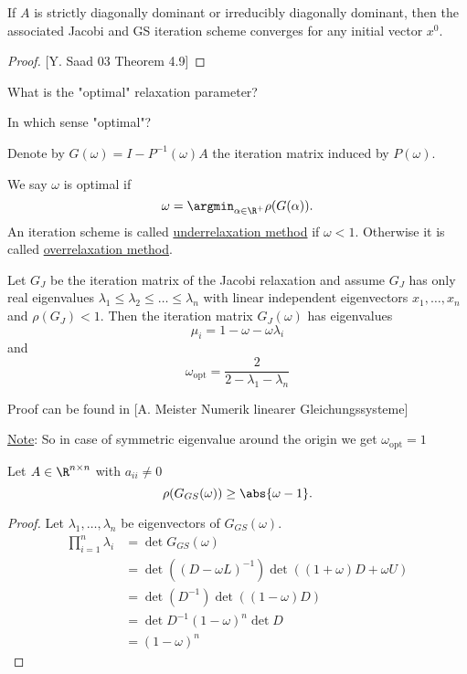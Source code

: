 \begin{theorem}
\label{thm:theorem2.3}
	If $A$ is strictly diagonally dominant or irreducibly diagonally dominant, then the associated Jacobi and GS iteration scheme converges for any initial vector $x^{0}$.
\end{theorem}

\begin{proof}
\label{thm:theorem2.3proof}
	[Y. Saad 03 Theorem 4.9]
\end{proof}

What is the "optimal" relaxation parameter?

In which sense "optimal"?

Denote by $G(\omega )=I-P^{-1}(\omega )A$ the iteration matrix induced by $P(\omega )$.

We say $\omega $ is optimal if
\[
	\omega  = \argmin_{\alpha \in \R^{+}} \rho(G(\alpha ))
.\] 
An iteration scheme is called \underline{underrelaxation method} if $\omega  < 1$. Otherwise it is called \underline{overrelaxation method}.

\begin{theorem}
\label{thm:theorem2.4}
Let $G_{J}$ be the iteration matrix of the Jacobi relaxation and assume	$G_{J}$ has only real eigenvalues $\lambda_1 \leq \lambda_2 \leq \ldots \leq \lambda_{n}$ with linear independent eigenvectors $x_1, \ldots , x_{n}$ and $\rho(G_{J}) < 1$. Then the iteration matrix $G_{J}(\omega )$ has eigenvalues
\[
\mu _{i} =  1 - \omega - \omega \lambda _{i}
\] 
and 
\[
\omega _{\text{opt}} = \frac{2}{2-\lambda_1-\lambda _{n}}
\] 

Proof can be found in [A. Meister Numerik linearer Gleichungssysteme]
\end{theorem}

\underline{Note}: So in case of symmetric eigenvalue around the origin we get $\omega _{\text{opt}}=1$

\begin{theorem}
\label{thm:theorem2.5}
	Let $A \in \R^{n \times n}$ with $a_{ii} \neq 0$
	\[
		\rho(G_{GS}(\omega )) \geq \abs{\omega -1} 
	.\] 
\end{theorem}

\begin{proof}
\label{thm:theorem2.5proof}
Let $\lambda _{1}, \ldots , \lambda _{n}$ be eigenvectors of $G_{GS}(\omega )$.
\begin{align*}
	\prod_{i=1}^{n} \lambda _{i} &= \det G_{GS}(\omega ) \\
								 &= \det ((D-\omega L)^{-1}) \det ((1+\omega ) D+ \omega U) \\
								 &= \det (D^{-1}) \det((1-\omega )D) \\
								 &= \det D^{-1} (1-\omega )^{n} \det D \\
								 &= (1-\omega )^{n}
\end{align*}

\end{proof}
